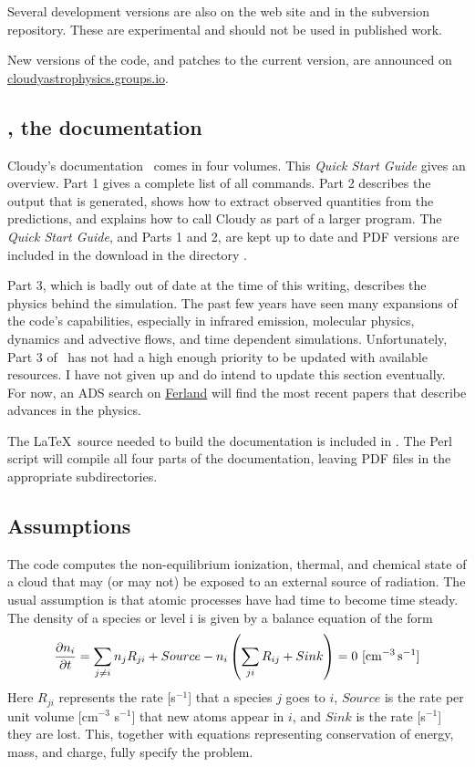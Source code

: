 \documentclass[12pt,twoside]{article}
\begin{document}
{Several development versions are also on the web site and in the
subversion repository.  These are experimental and should not be used in
published work.

New versions of the code, and patches to the current version, are
announced on  
\href{https://cloudyastrophysics.groups.io}{cloudyastrophysics.groups.io}.

\subsection{\Hazy, the documentation}

Cloudy's documentation \Hazy\ comes in four volumes.
This \emph{Quick Start Guide} gives an overview.
Part 1 gives a complete list of all commands.
Part 2 describes the output that is generated, shows how to extract
observed quantities from the predictions, and explains how to call Cloudy
as part of a larger program.  
The \emph{Quick Start Guide}, and Parts 1 and 2, are kept up to date and PDF versions are included
in the download in the directory .

Part 3, which is badly out of date at the time of this writing, describes
the physics behind the simulation.  The past few years have seen many
expansions of the code's capabilities, especially in infrared emission,
molecular physics, dynamics and advective flows,
and time dependent simulations.
Unfortunately, Part 3 of \Hazy\ has not had a high enough
priority to be updated with available resources.  I have not given up and
do intend to update this section eventually.  For now, an ADS search on
\href{http://adsabs.harvard.edu/cgi-bin/abs_connect?author=ferland\%2C+g&amp;return_req=no_params}{Ferland} will find the most recent papers that describe advances in the
physics.

The \LaTeX\ source needed to build the documentation is included in .
The Perl script  will compile all four parts of the documentation,
leaving PDF files in the appropriate subdirectories.

\subsection{Assumptions}

The code computes the non-equilibrium ionization, thermal, and chemical
state of a cloud that may (or may not) be exposed to an external source
of radiation.  The usual assumption is that atomic processes have had time
to become time steady.  The density of a species or level i is given by
a balance equation of the form
\begin{equation}
\frac{\partial n_i}{\partial t} = \sum_{j \ne i} n_j R_{ji} +
  Source - n_i \left( \sum_{ji} R_{ij}  + Sink \right) = 0
  \ \rm{[cm^{-3} \, s^{-1}]}
\end{equation}
Here $R_{ji}$ represents the rate [s$^{-1}$] that a species $j$ goes to $i$,
$Source$ is
the rate per unit volume [cm$^{-3}$ s$^{-1}$]
that new atoms appear in $i$, and $Sink$
is the rate [s$^{-1}$] they are lost.  This,
together with equations representing
conservation of energy, mass, and charge, fully specify the problem.

}
\end{document}
